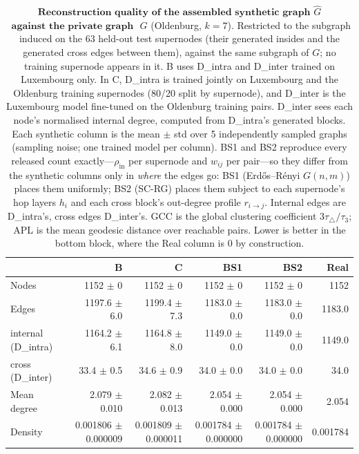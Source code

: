 \begin{table}[H]
\centering
\caption{$\textbf{Reconstruction quality of the assembled synthetic graph}$
$\widehat{G}$ $\textbf{ against the private graph }$ $G$ (Oldenburg, $k{=}7$). Restricted to the subgraph induced on the 63 held-out test supernodes (their generated insides and the generated cross edges between them), against the same subgraph of $G$; no training supernode appears in it.
B uses D\_intra and D\_inter trained on Luxembourg only. In C, D\_intra is trained jointly on Luxembourg and the Oldenburg training supernodes (80/20 split by supernode), and D\_inter is the Luxembourg model fine-tuned on the Oldenburg training pairs. D\_inter sees each node's normalised internal degree, computed from D\_intra's generated blocks. Each synthetic column is the
mean $\pm$ std over 5 independently sampled graphs (sampling noise; one trained
model per column). BS1 and BS2 reproduce every released count exactly---$\rho_{\mathrm{in}}$
per supernode and $w_{ij}$ per pair---so they differ from the synthetic columns
only in \emph{where} the edges go: BS1 (Erd\H{o}s--R\'enyi $G(n,m)$) places them
uniformly; BS2 (SC-RG) places them subject to each supernode's hop layers $h_i$ and
each cross block's out-degree profile $r_{i\to j}$. Internal edges are D\_intra's, cross edges
D\_inter's. GCC is the global clustering coefficient $3\tau_{\triangle}/\tau_{3}$;
APL is the mean geodesic distance over reachable pairs. Lower is better in the
bottom block, where the Real column is $0$ by construction.}
\label{tab:lsyn-oldenburg-k7-test}
\begin{tabular}{lrrrrr}
\toprule
 & B & C & BS1 & BS2 & Real \\
\midrule
Nodes                         & 1152 $\pm$ 0 & 1152 $\pm$ 0 & 1152 $\pm$ 0 & 1152 $\pm$ 0 & 1152 \\
Edges                         & 1197.6 $\pm$ 6.0 & 1199.4 $\pm$ 7.3 & 1183.0 $\pm$ 0.0 & 1183.0 $\pm$ 0.0 & 1183.0 \\
\quad internal (D\_intra)     & 1164.2 $\pm$ 6.1 & 1164.8 $\pm$ 8.0 & 1149.0 $\pm$ 0.0 & 1149.0 $\pm$ 0.0 & 1149.0 \\
\quad cross (D\_inter)        & 33.4 $\pm$ 0.5 & 34.6 $\pm$ 0.9 & 34.0 $\pm$ 0.0 & 34.0 $\pm$ 0.0 & 34.0 \\
Mean degree                   & 2.079 $\pm$ 0.010 & 2.082 $\pm$ 0.013 & 2.054 $\pm$ 0.000 & 2.054 $\pm$ 0.000 & 2.054 \\
Density                       & 0.001806 $\pm$ 0.000009 & 0.001809 $\pm$ 0.000011 & 0.001784 $\pm$ 0.000000 & 0.001784 $\pm$ 0.000000 & 0.001784 \\

\end{tabular}
\end{table}
